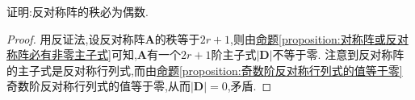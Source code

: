 \documentclass[../../main.tex]{subfiles}%
\begin{document}
\begin{proposition}[反对称阵的秩必为偶数]\label{proposition:反对称阵的秩必为偶数}
证明:反对称阵的秩必为偶数.
\end{proposition}
\begin{proof}

用反证法,设反对称阵\(\boldsymbol{A}\)的秩等于\(2r + 1\),则由\hyperref[proposition:对称阵或反对称阵必有非零主子式]{命题\ref{proposition:对称阵或反对称阵必有非零主子式}}可知,\(\boldsymbol{A}\)有一个\(2r + 1\)阶主子式\(|\boldsymbol{D}|\)不等于零. 注意到反对称阵的主子式是反对称行列式,而由\hyperref[proposition:奇数阶反对称行列式的值等于零]{命题\ref{proposition:奇数阶反对称行列式的值等于零}}奇数阶反对称行列式的值等于零,从而\(|\boldsymbol{D}| = 0\),矛盾.

\end{proof}
\end{document}
